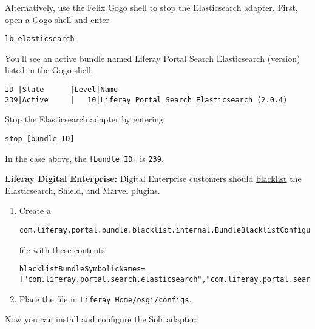 Alternatively, use the
\href{/docs/7-0/reference/-/knowledge_base/r/using-the-felix-gogo-shell}{Felix
Gogo shell} to stop the Elasticsearch adapter. First, open a Gogo shell
and enter

\begin{verbatim}
lb elasticsearch
\end{verbatim}

You'll see an active bundle named Liferay Portal Search Elasticsearch
(version) listed in the Gogo shell.

\begin{verbatim}
ID |State      |Level|Name
239|Active     |   10|Liferay Portal Search Elasticsearch (2.0.4)
\end{verbatim}

Stop the Elasticsearch adapter by entering

\begin{verbatim}
stop [bundle ID]
\end{verbatim}

In the case above, the \texttt{{[}bundle\ ID{]}} is \texttt{239}.

\noindent\hrulefill

\textbf{Liferay Digital Enterprise:} Digital Enterprise customers should
\href{/docs/7-0/user/-/knowledge_base/u/blacklisting-osgi-modules}{blacklist}
the Elasticsearch, Shield, and Marvel plugins.

\begin{enumerate}
\def\labelenumi{\arabic{enumi}.}
\item
  Create a

\begin{verbatim}
com.liferay.portal.bundle.blacklist.internal.BundleBlacklistConfiguration.config
\end{verbatim}

  file with these contents:

\begin{verbatim}
blacklistBundleSymbolicNames=["com.liferay.portal.search.elasticsearch","com.liferay.portal.search.elasticsearch.shield","com.liferay.portal.search.elasticsearch.marvel.web"]
\end{verbatim}
\item
  Place the file in \texttt{Liferay\ Home/osgi/configs}.
\end{enumerate}

\noindent\hrulefill

Now you can install and configure the Solr adapter:

